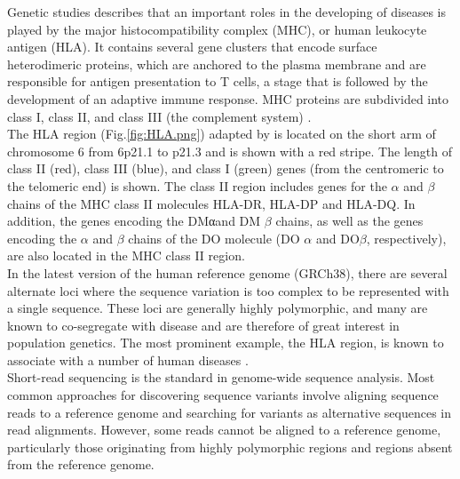 Genetic studies describes that an important roles in the developing of diseases is played by the major histocompatibility complex (MHC), or human leukocyte antigen (HLA). It contains several gene clusters that encode surface heterodimeric proteins, which are anchored to the plasma membrane and are responsible for antigen presentation to T cells, a stage that is followed by the development of an adaptive immune response. MHC proteins are subdivided into class I, class II, and class III (the complement system) \cite{campbell1993map}. \\



The HLA region (Fig.\ref{fig:HLA.png}) adapted by \cite{zakharova2019contribution} is located on the short arm of chromosome 6 from 6p21.1 to p21.3 and is shown with a red stripe. The length of class II (red), class III (blue), and class I (green) genes (from the centromeric to the telomeric end) is shown. The class II region includes genes for the {\ensuremath{\alpha}} and {\ensuremath{\beta}} chains of the MHC class II molecules HLA-DR, HLA-DP and HLA-DQ. In addition, the genes encoding the DMαand DM {\ensuremath{\beta}} chains, as well as the genes encoding the {\ensuremath{\alpha}} and {\ensuremath{\beta}} chains of the DO molecule (DO {\ensuremath{\alpha}} and DO{\ensuremath{\beta}}, respectively), are also located in the MHC class II region.\\




In the latest version \cite{eggertsson2017graphtyper} of the human reference genome (GRCh38), there are several alternate loci where the sequence variation is too complex to be represented with a single sequence. These loci are generally highly polymorphic, and many are known to co-segregate with disease and are therefore of great interest in population genetics. The most prominent example, the HLA region, is known to associate with a number of human diseases \cite{tiwari2012hla}. \\

Short-read sequencing is the standard in genome-wide sequence analysis. Most common approaches for discovering sequence variants involve aligning sequence reads to a reference genome \cite{li2009fast} and searching for variants as alternative sequences in read alignments. However, some reads cannot be aligned to a reference genome, particularly those originating from highly polymorphic regions and regions absent from the reference genome.